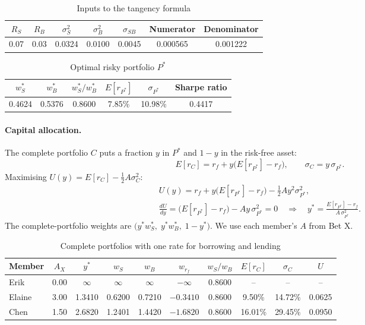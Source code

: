 \documentclass[11pt]{article}
\newcommand{\Er}[1]{E[r_{#1}]}
\begin{document}
\begin{table}[H]
\centering
\caption{Inputs to the tangency formula}
\begin{tabular}{ccccccc}
\toprule
$R_S$ & $R_B$ & $\sigma_S^2$ & $\sigma_B^2$ & $\sigma_{SB}$ & Numerator & Denominator \\
\midrule
0.07 & 0.03 & 0.0324 & 0.0100 & 0.0045 & 0.000565 & 0.001222 \\
\bottomrule
\end{tabular}
\end{table}

\begin{table}[H]
\centering
\caption{Optimal risky portfolio $P^*$}\label{tab:pstar}
\begin{tabular}{cccccc}
\toprule
$w_S^*$ & $w_B^*$ & $w_S^*/w_B^*$ & $\Er{P^*}$ & $\sigma_{P^*}$ & Sharpe ratio \\
\midrule
0.4624 & 0.5376 & 0.8600 & 7.85\% & 10.98\% & 0.4417 \\
\bottomrule
\end{tabular}
\end{table}

\paragraph{Capital allocation.}
The complete portfolio $C$ puts a fraction $y$ in $P^*$ and $1-y$ in the risk-free asset:
\[
\Er{C} = r_f + y\bigl(\Er{P^*} - r_f\bigr), \qquad \sigma_C = y\,\sigma_{P^*}.
\]
Maximising $U(y) = \Er{C} - \tfrac12 A\sigma_C^2$:
\begin{gather*}
U(y) = r_f + y\bigl(\Er{P^*} - r_f\bigr) - \tfrac12 A y^2\sigma_{P^*}^2, \\
\frac{dU}{dy} = \bigl(\Er{P^*} - r_f\bigr) - A y\,\sigma_{P^*}^2 = 0
\quad\Longrightarrow\quad
y^* = \frac{\Er{P^*} - r_f}{A\,\sigma_{P^*}^2}.
\end{gather*}
The complete-portfolio weights are $\bigl(y^*w_S^*,\; y^*w_B^*,\; 1-y^*\bigr)$. We use each member's $A$ from Bet X.

\begin{table}[H]
\centering
\caption{Complete portfolios with one rate for borrowing and lending}\label{tab:complete}
\begin{tabular}{lccccccccc}
\toprule
Member & $A_X$ & $y^*$ & $w_S$ & $w_B$ & $w_{r_f}$ & $w_S/w_B$ & $\Er{C}$ & $\sigma_C$ & $U$ \\
\midrule
Erik   & 0.00 & $\infty$ & $\infty$ & $\infty$ & $-\infty$ & 0.8600 & -- & -- & -- \\
Elaine & 3.00 & 1.3410 & 0.6200 & 0.7210 & $-0.3410$ & 0.8600 & 9.50\%  & 14.72\% & 0.0625 \\
Chen   & 1.50 & 2.6820 & 1.2401 & 1.4420 & $-1.6820$ & 0.8600 & 16.01\% & 29.45\% & 0.0950 \\
\bottomrule
\end{tabular}
\end{table}
\end{document}
